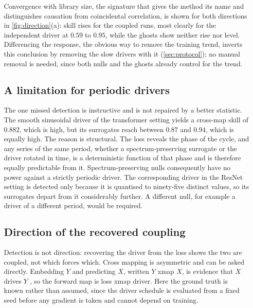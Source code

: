 \documentclass{article}
\begin{document}
Convergence with library size, the signature that gives the method its name and
distinguishes causation from coincidental correlation, is shown for both directions in
\cref{fig:direction}(a): skill rises for the coupled runs, most clearly for the independent
driver at $0.59$ to $0.95$, while the ghosts show neither rise nor level. Differencing the
response, the obvious way to remove the training trend, inverts this conclusion by removing
the slow drivers with it (\cref{sec:protocol}); no manual removal is needed, since both
nulls and the ghosts already control for the trend.

\subsection{A limitation for periodic drivers}\label{sec:periodic}

The one missed detection is instructive and is not repaired by a better statistic. The
smooth sinusoidal driver of the transformer setting yields a cross-map skill of $0.882$,
which is high, but its surrogates reach between $0.87$ and $0.94$, which is equally high.
The reason is structural. The loss reveals the phase of the cycle, and any series of the
same period, whether a spectrum-preserving surrogate or the driver rotated in time, is a
deterministic function of that phase and is therefore equally predictable from it.
Spectrum-preserving nulls consequently have no power against a strictly periodic driver.
The corresponding driver in the ResNet setting is detected only because it is quantised to
ninety-five distinct values, so its surrogates depart from it considerably further. A
different null, for example a driver of a different period, would be required.

\subsection{Direction of the recovered coupling}\label{sec:direction}

Detection is not direction: recovering the driver from the loss shows the two are coupled,
not which forces which. Cross mapping is asymmetric and can be asked directly. Embedding
$Y$ and predicting $X$, written $Y$ xmap $X$, is evidence that $X$ drives $Y$
\citep{sugihara2012detecting}, so the forward map is loss xmap driver. Here the ground
truth is known rather than assumed, since the driver schedule is evaluated from a fixed
seed before any gradient is taken and cannot depend on training.
\end{document}
